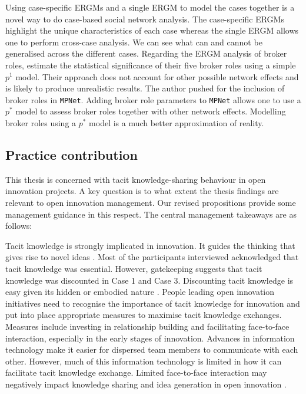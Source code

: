 Using case-specific ERGMs and a single ERGM to model the cases together is a novel way to do case-based social network analysis. The case-specific ERGMs highlight the unique characteristics of each case whereas the single ERGM allows one to perform cross-case analysis. We can see what can and cannot be generalised across the different cases. Regarding the ERGM analysis of broker roles, \citet{gould1989structures} estimate the statistical significance of their five broker roles using a simple $p^1$ model. Their approach does not account for other possible network effects and is likely to produce unrealistic results. The author pushed for the inclusion of broker roles in \texttt{MPNet}. Adding broker role parameters to \texttt{MPNet} allows one to use a $p^*$ model to assess broker roles together with other network effects. Modelling broker roles using a $p^*$ model is a much better approximation of reality.

\subsection{Practice contribution}

This thesis is concerned with tacit knowledge-sharing behaviour in open innovation projects. A key question is to what extent the thesis findings are relevant to open innovation management. Our revised propositions provide some management guidance in this respect. The central management takeaways are as follows: \medskip

Tacit knowledge is strongly implicated in innovation. It guides the thinking that gives rise to novel ideas \citep{leonard1998role,lam2000tacit,senker2008contribution}. Most of the participants interviewed acknowledged that tacit knowledge was essential. However, gatekeeping suggests that tacit knowledge was discounted in Case 1 and Case 3. Discounting tacit knowledge is easy given its hidden or embodied nature \citep{horvath2000working}. People leading open innovation initiatives need to recognise the importance of tacit knowledge for innovation and put into place appropriate measures to maximise tacit knowledge exchanges. Measures include investing in relationship building and facilitating face-to-face interaction, especially in the early stages of innovation. Advances in information technology make it easier for dispersed team members to communicate with each other. However, much of this information technology is limited in how it can facilitate tacit knowledge exchange. Limited face-to-face interaction may negatively impact knowledge sharing and idea generation in open innovation \citep{johannessen2001mismanagement}. \medskip

